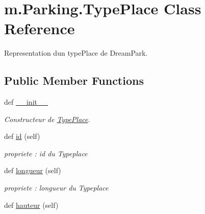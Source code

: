 \hypertarget{classm_1_1_parking_1_1_type_place}{}\section{m.\+Parking.\+Type\+Place Class Reference}
\label{classm_1_1_parking_1_1_type_place}


Representation d\textquotesingle{}un type\+Place de Dream\+Park.  


\subsection*{Public Member Functions}
\begin{DoxyCompactItemize}
\item 
def \hyperlink{classm_1_1_parking_1_1_type_place_adb476b8ca414532447004a4f1283b4bc}{\+\_\+\+\_\+init\+\_\+\+\_\+}
\begin{DoxyCompactList}\small\item\em Constructeur de \hyperlink{classm_1_1_parking_1_1_type_place}{Type\+Place}. \end{DoxyCompactList}\item 
\hypertarget{classm_1_1_parking_1_1_type_place_a1a77f383ea6ef4bf5583fcac1d015a23}{}def \hyperlink{classm_1_1_parking_1_1_type_place_a1a77f383ea6ef4bf5583fcac1d015a23}{id} (self)\label{classm_1_1_parking_1_1_type_place_a1a77f383ea6ef4bf5583fcac1d015a23}

\begin{DoxyCompactList}\small\item\em propriete \+: id du Typeplace \end{DoxyCompactList}\item 
\hypertarget{classm_1_1_parking_1_1_type_place_ae84329d2f1f7e19484a80e080d65cd93}{}def \hyperlink{classm_1_1_parking_1_1_type_place_ae84329d2f1f7e19484a80e080d65cd93}{longueur} (self)\label{classm_1_1_parking_1_1_type_place_ae84329d2f1f7e19484a80e080d65cd93}

\begin{DoxyCompactList}\small\item\em propriete \+: longueur du Typeplace \end{DoxyCompactList}\item 
\hypertarget{classm_1_1_parking_1_1_type_place_a039a4167d68d277533472aebbf60a782}{}def \hyperlink{classm_1_1_parking_1_1_type_place_a039a4167d68d277533472aebbf60a782}{hauteur} (self)\label{classm_1_1_parking_1_1_type_place_a039a4167d68d277533472aebbf60a782}


\end{DoxyCompactItemize}
